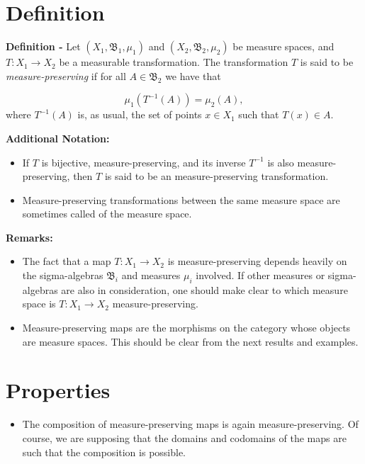 \documentclass{article}
\begin{document}
\section{Definition}

{\bf Definition -} Let $(X_1, \mathfrak{B}_1, \mu_1)$ and $(X_2, \mathfrak{B}_2, \mu_2)$ be measure spaces, and $T:X_1 \to X_2$ be a measurable transformation.  The transformation $T$ is said to be \emph{measure-preserving} if for all $A \in \mathfrak{B}_2$ we have that

\begin{equation*}
\mu_1(T^{-1}(A)) = \mu_2(A),
\end{equation*}
where $T^{-1}(A)$ is, as usual, the set of points $x\in X_1$ such that $T(x)\in A$.

{\bf Additional Notation:}
\begin{itemize}
\item If $T$ is bijective, measure-preserving, and its inverse $T^{-1}$ is also measure-preserving, then $T$ is said to be an \emph{} measure-preserving transformation.
\end{itemize}
\begin{itemize}
\item Measure-preserving transformations between the same measure space are sometimes called \emph{} of the measure space.
\end{itemize}

{\bf Remarks:}
\begin{itemize}
\item The fact that a map $T:X_1 \longrightarrow X_2$ is measure-preserving depends heavily on the sigma-algebras $\mathfrak{B}_i$ and measures $\mu_i$ involved. If other measures or sigma-algebras are also in consideration, one should make clear to which measure space is $T:X_1 \longrightarrow X_2$ measure-preserving.
\end{itemize}
\begin{itemize}
\item Measure-preserving maps are the morphisms on the category whose objects are measure spaces. This should be clear from the next results and examples.
\end{itemize}

\section{Properties}

\begin{itemize}
\item The composition of measure-preserving maps is again measure-preserving. Of course, we are supposing that the domains and codomains of the maps are such that the composition is possible.
\end{itemize}
\end{document}
